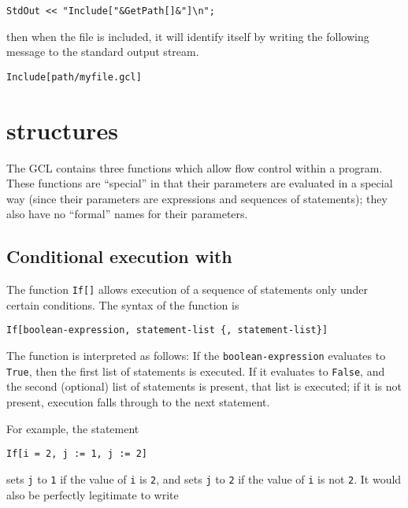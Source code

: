 \begin{verbatim}
StdOut << "Include["&GetPath[]&"]\n";
\end{verbatim}

\noindent
then when the file is included, it will identify itself by writing
the following message to the standard output stream.  

\begin{verbatim}
Include[path/myfile.gcl]
\end{verbatim}


\section{ structures}

The GCL contains three functions which allow flow control within a
program.  These functions are ``special'' in that their parameters are
evaluated in a special way (since their parameters are expressions and
sequences of statements); they also have no ``formal'' names for their
parameters.

\subsection{Conditional execution with }

The function \verb+If[]+ allows execution of a sequence of statements
only under certain conditions.  The syntax of the function is

\begin{verbatim}
If[boolean-expression, statement-list {, statement-list}]
\end{verbatim}

\noindent The function is interpreted as follows: If the
\verb+boolean-expression+ evaluates to \verb+True+, then the first
list of statements is executed.  If it evaluates to \verb+False+, and
the second (optional) list of statements is present, that list is
executed; if it is not present, execution falls through to the next
statement.

For example, the statement

\begin{verbatim}
If[i = 2, j := 1, j := 2]
\end{verbatim}

\noindent sets \verb+j+ to \verb+1+ if the value of \verb+i+ is
\verb+2+, and sets \verb+j+ to \verb+2+ if the value of \verb+i+ is
not \verb+2+.  It would also be perfectly legitimate to write

